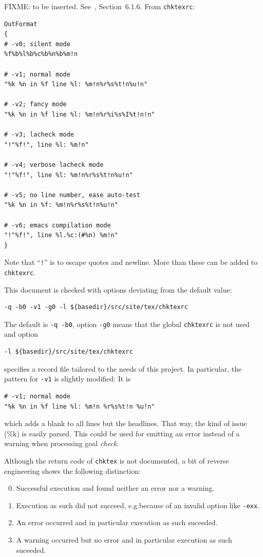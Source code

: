FIXME\@: to be inserted. 
See~\cite{ChkTeX22}, Section~6.1.6. 
From \texttt{chktexrc}: 
\begin{verbatim}
OutFormat
{
# -v0; silent mode
%f%b%l%b%c%b%n%b%m!n

# -v1; normal mode
"%k %n in %f line %l: %m!n%r%s%t!n%u!n"

# -v2; fancy mode
"%k %n in %f line %l: %m!n%r%i%s%I%t!n!n"

# -v3; lacheck mode
"!"%f!", line %l: %m!n"

# -v4; verbose lacheck mode
"!"%f!", line %l: %m!n%r%s%t!n%u!n"

# -v5; no line number, ease auto-test
"%k %n in %f: %m!n%r%s%t!n%u!n"

# -v6; emacs compilation mode
"!"%f!", line %l.%c:(#%n) %m!n"
}
\end{verbatim}

Note that ``\texttt{!}'' is to escape quotes and newline. 
More than these can be added to \texttt{chktexrc}. 


This document is checked with options deviating from the default value: 
%
\begin{verbatim}
-q -b0 -v1 -g0 -l ${basedir}/src/site/tex/chktexrc
\end{verbatim}
%
The default is \texttt{-q -b0}, 
option \texttt{-g0} means that the global \texttt{chktexrc} is not used 
and option 
%
\begin{verbatim}
-l ${basedir}/src/site/tex/chktexrc
\end{verbatim}
%
specifies a record file tailored to the needs of this project. 
In particular, the pattern for \texttt{-v1} is slightly modified: 
It is 
%
\begin{verbatim}
# -v1; normal mode
"%k %n in %f line %l: %m!n %r%s%t!n %u!n"
\end{verbatim}
%
which adds a blank to all lines but the headlines. 
That way, the kind of issue (\%k) is easily parsed. 
This could be used for emitting an error instead of a warning 
when processing goal \emph{check}. 

Although the return code of \texttt{chktex} is not documented, 
a bit of reverse engineering shows the following distinction: 
%
\begin{enumerate}\setcounter{enumi}{-1}
  \item Successful execution and found neither an error nor a warning. 
  \item Execution as such did not succeed, 
  e.g.\@ because of an invalid option like \texttt{-exx}. 
  \item An error occurred and in particular execution as such suceeded. 
  \item A warning occurred but no error and in particular execution as such suceeded. 
\end{enumerate}

